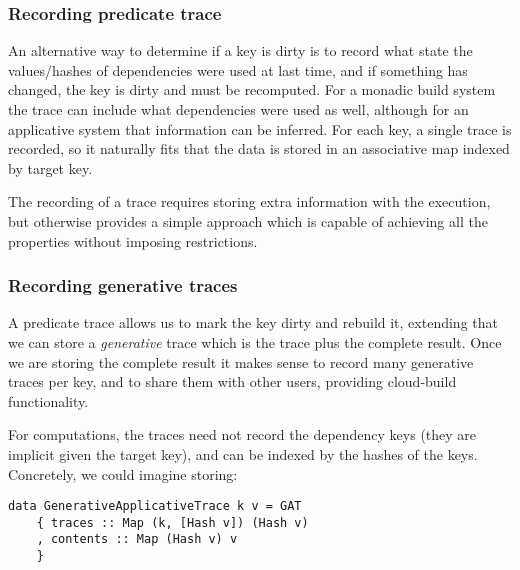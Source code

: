 \subsubsection{Recording predicate trace}

An alternative way to determine if a key is dirty is to record what state the values/hashes of dependencies were used at last time, and if something has changed, the key is dirty and must be recomputed. For a monadic build system the trace can include what dependencies were used as well, although for an applicative system that information can be inferred. For each key, a single trace is recorded, so it naturally fits that the data is stored in an associative map indexed by target key.

The recording of a trace requires storing extra information with the execution, but otherwise provides a simple approach which is capable of achieving all the properties without imposing restrictions.

\subsubsection{Recording generative traces}

A predicate trace allows us to mark the key dirty and rebuild it, extending that we can store a \textit{generative} trace which is the trace plus the complete result. Once we are storing the complete result it makes sense to record many generative traces per key, and to share them with other users, providing cloud-build functionality.



For  computations, the traces need not record the dependency keys (they are implicit given the target key), and can be indexed by the hashes of the keys. Concretely, we could imagine storing:

\begin{verbatim}
data GenerativeApplicativeTrace k v = GAT
    { traces :: Map (k, [Hash v]) (Hash v)
    , contents :: Map (Hash v) v
    }
\end{verbatim}

